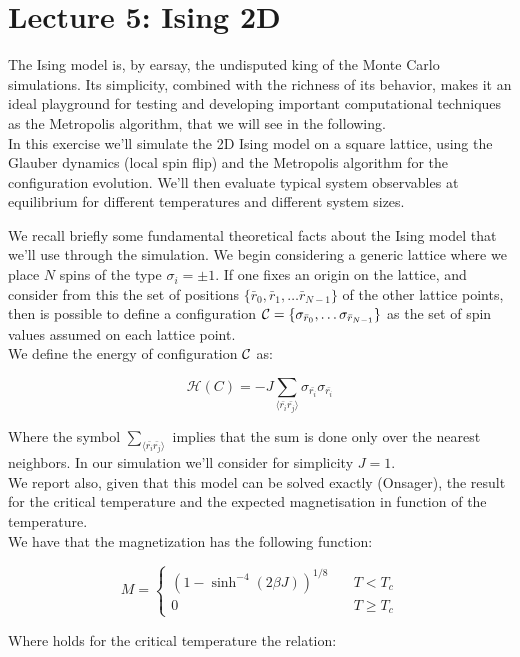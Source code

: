 \chapter*{Lecture 5: Ising 2D}

The Ising model is, by earsay, the undisputed king of the Monte Carlo simulations. Its simplicity, combined with the richness of its behavior, 
makes it an ideal playground for testing and developing important computational techniques as the Metropolis algorithm, that we will 
see in the following. \\
In this exercise we'll simulate the 2D Ising model on a square lattice, using the Glauber dynamics (local spin flip) and the Metropolis algorithm
for the configuration evolution. We'll then evaluate typical system observables at equilibrium for different temperatures and different system sizes.

We recall briefly some fundamental theoretical facts about the Ising model that we'll use through the simulation.
We begin considering a generic lattice where we place $N$ spins of the type $\sigma_i  = \pm 1$. If one fixes an origin on the lattice, and consider
from this the set of positions $\{\bar{r}_0, \bar{r}_1, \dots \bar{r}_{N-1}\}$ of the other lattice points, then is possible 
to define a configuration $\mathcal{C} = \{\sigma_{\bar{r}_0}, \dots \sigma_{\bar{r}_{N-1}}\}$ as the set of spin values assumed on each lattice point. \\
We define the energy of configuration $\mathcal{C}$ as:

$$
\mathcal{H}(C) = -J \sum_{\langle \bar{r_i}\bar{r_j} \rangle} \sigma_{\bar{r_i}} \sigma_{\bar{r_i}}
$$

Where the symbol $\sum_{\langle \bar{r_i}\bar{r_j} \rangle}$ implies that the sum is done only over the nearest neighbors. In our simulation 
we'll consider for simplicity $J=1$. \\

We report also, given that this model can be solved exactly (Onsager), the result for the critical temperature and the expected magnetisation in function
of the temperature. \\
We have that the magnetization has the following function:

$$
M = 
\begin{cases}
(1-\sinh^{-4}(2\beta J))^{1/8} \quad&T<T_c\\
0 &T \geq T_c    
\end{cases}
$$


Where holds for the critical temperature the relation:

